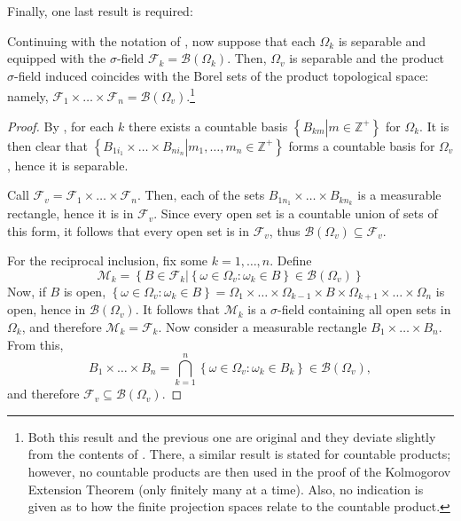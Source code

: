 Finally, one last result is required:
\begin{lemm}\label{lemma:Borel sets in separable spaces}
		Continuing with the notation of , now suppose that each \(\Omega_k\) is separable and equipped with the \(\sigma\)-field \(\mathcal{F}_k=\mathscr{B}\left(\Omega_k\right)\). Then, \(\Omega_v\) is separable and the product \(\sigma\)-field induced coincides with the Borel sets of the product topological space: namely, \(\mathcal{F}_{1}\times \dots \times \mathcal{F}_{n}=\mathscr{B}\left(\Omega_v\right)\).\footnote{Both this result and the previous one are original and they deviate slightly from the contents of \cite{ash1972real}. There, a similar result is stated for countable products; however, no countable products are then used in the proof of the Kolmogorov Extension Theorem (only finitely many at a time). Also, no indication is given as to how the finite projection spaces relate to the countable product.}
\end{lemm}
\begin{proof}
		By , for each \(k\) there exists a countable basis \(\left\{B_{km}\left|m\in\mathbb{Z}^+\right.\right\}\) for \(\Omega_k\). It is then clear that \(\left\{B_{1i_1}\times\dots\times B_{ni_n}\left|m_1,\dots,m_n\in\mathbb{Z}^+\right.\right\}\) forms a countable basis for \(\Omega_v\), hence it is separable.

		Call \(\mathcal{F}_v=\mathcal{F}_{1}\times\dots\times\mathcal{F}_{n}\). Then, each of the sets \(B_{1n_1}\times\dots\times B_{kn_k}\) is a measurable rectangle, hence it is in \(\mathcal{F}_v\). Since every open set is a countable union of sets of this form, it follows that every open set is in \(\mathcal{F}_v\), thus \(\mathscr{B}\left(\Omega_v\right)\subseteq\mathcal{F}_v\).

		For the reciprocal inclusion, fix some \(k=1,\dots,n\). Define  
\[
		\mathcal{M}_k=\left\{\left.B\in\mathcal{F}_k\right|\left\{\omega\in\Omega_v\colon\omega_k\in B\right\}\in\mathscr{B}\left(\Omega_v\right)\right\}
\]
		Now, if \(B\) is open, \(\left\{\omega\in\Omega_v\colon\omega_k\in B\right\}=\Omega_1\times\dots\times\Omega_{k-1}\times B\times\Omega_{k+1}\times\dots\times\Omega_n\) is open, hence in \(\mathscr{B}\left(\Omega_v\right)\). It follows that \(\mathcal{M}_k\) is a \(\sigma\)-field containing all open sets in \(\Omega_k\), and therefore \(\mathcal{M}_k=\mathcal{F}_k\). Now consider a measurable rectangle \(B_1\times\dots\times B_n\). From this,
		\[
				B_1\times\dots\times B_n=\bigcap_{k=1}^n\left\{\omega\in\Omega_v\colon \omega_k\in B_k\right\}\in\mathscr{B}\left(\Omega_v\right)
		,\]
		and therefore \(\mathcal{F}_v\subseteq\mathscr{B}\left(\Omega_v\right)\).
\end{proof}

